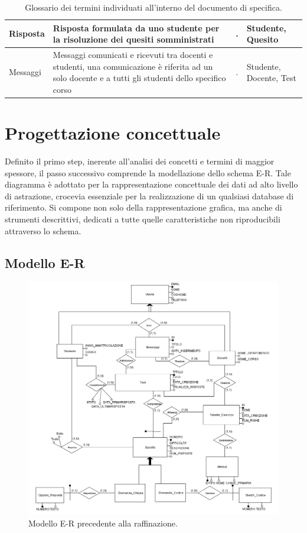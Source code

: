 \documentclass{article}
\begin{document}
\begin{table}[H]
\begin{tabularx}{\textwidth}{|X|p{6cm}|X|X|}
        \hline
        Risposta & Risposta formulata da uno studente per la risoluzione dei quesiti somministrati & . & Studente, Quesito \\
        \hline 
        Messaggi & Messaggi comunicati e ricevuti tra docenti e studenti, una comunicazione è riferita ad un solo docente e a tutti gli studenti dello specifico corso & . & Studente, Docente, Test \\
        \hline
    \end{tabularx}
    \caption{Glossario dei termini individuati all'interno del documento di specifica.}
\end{table}

\newpage
\section{Progettazione concettuale}
\large
Definito il primo step, inerente all'analisi dei concetti e termini di maggior spessore, il passo successivo comprende la modellazione dello schema E-R. Tale diagramma è adottato per la rappresentazione concettuale dei dati ad alto livello di astrazione, crocevia essenziale per la realizzazione di un qualsiasi database di riferimento. Si compone non solo della rappresentazione grafica, ma anche di strumenti descrittivi, dedicati a tutte quelle caratteristiche non riproducibili attraverso lo schema. 

\subsection{Modello E-R}
\begin{figure}[H]
    \includegraphics[width=1\textwidth]{foto1.png}
    \caption{Modello E-R precedente alla raffinazione.}
\end{figure}
\end{document}

